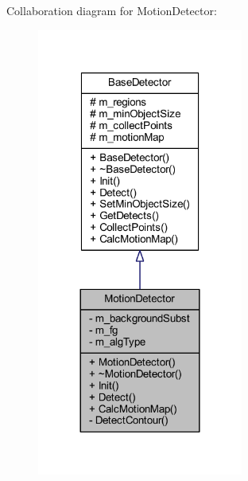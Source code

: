 Collaboration diagram for Motion\+Detector\+:\nopagebreak
\begin{figure}[H]
\begin{center}
\leavevmode
\includegraphics[width=192pt]{class_motion_detector__coll__graph}
\end{center}
\end{figure}
